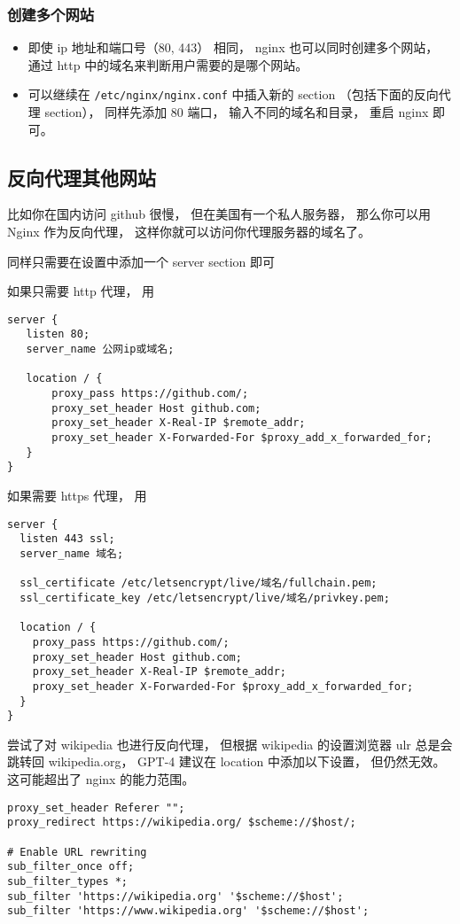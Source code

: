 \subsubsection{创建多个网站}
\begin{itemize}
\item 即使 ip 地址和端口号（80, 443） 相同， nginx 也可以同时创建多个网站， 通过 http 中的域名来判断用户需要的是哪个网站。
\item 可以继续在 \verb`/etc/nginx/nginx.conf` 中插入新的 section （包括下面的反向代理 section）， 同样先添加 80 端口， 输入不同的域名和目录， 重启 nginx 即可。
\end{itemize}


\subsection{反向代理其他网站}
比如你在国内访问 github 很慢， 但在美国有一个私人服务器， 那么你可以用 Nginx 作为反向代理， 这样你就可以访问你代理服务器的域名了。

同样只需要在设置中添加一个 server section 即可

如果只需要 http 代理， 用
\begin{lstlisting}[language=none]
server {
   listen 80;
   server_name 公网ip或域名;

   location / {
       proxy_pass https://github.com/;
       proxy_set_header Host github.com;
       proxy_set_header X-Real-IP $remote_addr;
       proxy_set_header X-Forwarded-For $proxy_add_x_forwarded_for;
   }
}
\end{lstlisting}

如果需要 https 代理， 用
\begin{lstlisting}[language=none]
server {
  listen 443 ssl;
  server_name 域名;

  ssl_certificate /etc/letsencrypt/live/域名/fullchain.pem;
  ssl_certificate_key /etc/letsencrypt/live/域名/privkey.pem;

  location / {
    proxy_pass https://github.com/;
    proxy_set_header Host github.com;
    proxy_set_header X-Real-IP $remote_addr;
    proxy_set_header X-Forwarded-For $proxy_add_x_forwarded_for;
  }
}
\end{lstlisting}

尝试了对 wikipedia 也进行反向代理， 但根据 wikipedia 的设置浏览器 ulr 总是会跳转回 wikipedia.org， GPT-4 建议在 location 中添加以下设置， 但仍然无效。 这可能超出了 nginx 的能力范围。
\begin{lstlisting}[language=none]
proxy_set_header Referer "";
proxy_redirect https://wikipedia.org/ $scheme://$host/;

# Enable URL rewriting
sub_filter_once off;
sub_filter_types *;
sub_filter 'https://wikipedia.org' '$scheme://$host';
sub_filter 'https://www.wikipedia.org' '$scheme://$host';
\end{lstlisting}

